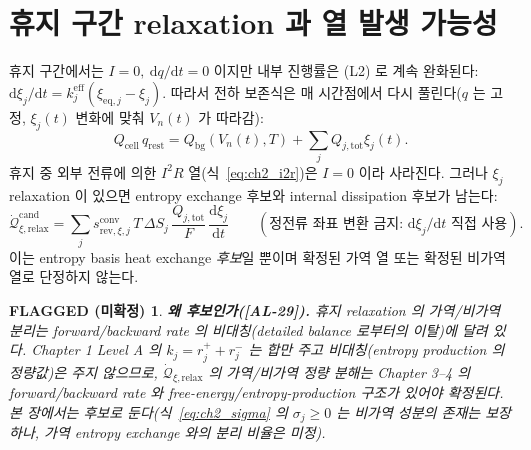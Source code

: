 \documentclass[11pt,a4paper]{article}
\newtheorem*{flagbox}{FLAGGED (미확정)}
\newcommand{\dd}{\mathrm{d}}
\newcommand{\eff}{\mathrm{eff}}
\newcommand{\eq}{\mathrm{eq}}
\newcommand{\bg}{\mathrm{bg}}
\newcommand{\cell}{\mathrm{cell}}
\newcommand{\tot}{\mathrm{tot}}
\newcommand{\rev}{\mathrm{rev}}
\newcommand{\rlx}{\mathrm{relax}}
\newcommand{\cand}{\mathrm{cand}}
\newcommand{\conv}{\mathrm{conv}}
\newcommand{\AL}[1]{\textsf{[AL-#1]}}
\begin{document}
\section{휴지 구간 relaxation 과 열 발생 가능성}\label{sec:ch2_rest}
휴지 구간에서는 $I=0,\ \dd q/\dd t=0$ 이지만 내부 진행률은 (L2) 로 계속 완화된다:
$\dd\xi_j/\dd t=k_j^{\eff}(\xi_{\eq,j}-\xi_j)$. 따라서 전하 보존식은 매 시간점에서 다시 풀린다($q$ 는 고정,
$\xi_j(t)$ 변화에 맞춰 $V_n(t)$ 가 따라감):
\begin{equation}
Q_\cell\,q_{\mathrm{rest}}=Q_\bg(V_n(t),T)+\sum_jQ_{j,\tot}\xi_j(t).
\label{eq:ch2_rest_balance}
\end{equation}
휴지 중 외부 전류에 의한 $I^2R$ 열(식~\eqref{eq:ch2_i2r})은 $I=0$ 이라 사라진다. 그러나 $\xi_j$ relaxation 이
있으면 entropy exchange 후보와 internal dissipation 후보가 남는다:
\begin{equation}
\dot{\mathcal Q}_{\xi,\rlx}^{\cand}=\sum_j s_{\rev,\xi,j}^{\conv}\,T\,\Delta S_j\,\frac{Q_{j,\tot}}{F}\,\frac{\dd\xi_j}{\dd t}
\qquad(\text{정전류 좌표 변환 금지: } \dd\xi_j/\dd t \text{ 직접 사용}).
\label{eq:ch2_relax}
\end{equation}
이는 entropy basis heat exchange \emph{후보}일 뿐이며 확정된 가역 열 또는 확정된 비가역 열로 단정하지 않는다.
\begin{flagbox}
\textbf{왜 후보인가(\AL{29}).} 휴지 relaxation 의 가역/비가역 분리는 forward/backward rate 의 비대칭(detailed
balance 로부터의 이탈)에 달려 있다. Chapter 1 Level A 의 $k_j=r_j^++r_j^-$ 는 \emph{합}만 주고 비대칭(entropy
production 의 정량값)은 주지 않으므로, $\dot{\mathcal Q}_{\xi,\rlx}$ 의 가역/비가역 \emph{정량} 분해는 Chapter
3--4 의 forward/backward rate 와 free-energy/entropy-production 구조가 있어야 확정된다. 본 장에서는 후보로
둔다(식~\eqref{eq:ch2_sigma} 의 $\sigma_j\ge0$ 는 비가역 \emph{성분}의 존재는 보장하나, 가역 entropy exchange
와의 분리 비율은 미정).
\end{flagbox}

\end{document}
